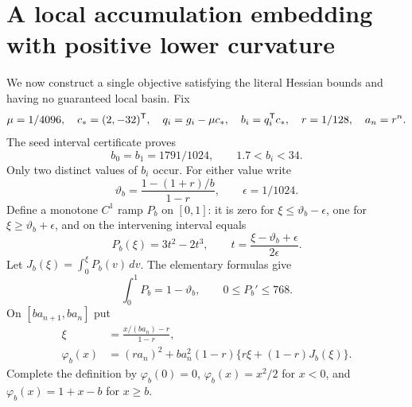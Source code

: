 \documentclass[10pt,oneside,openany]{book}
\theoremstyle{remark}\newtheorem{remark}{Remark}[chapter]
\begin{document}
\section{A local accumulation embedding with positive lower curvature}
We now construct a single objective satisfying the literal Hessian bounds and having no guaranteed local basin. Fix
\[
 \mu=1/4096,\quad c_*=(2,-32)^{\mathsf T},\quad
 q_i=g_i-\mu c_*,\quad b_i=q_i^{\mathsf T} c_*,\quad r=1/128,\quad a_n=r^n.
\]
The seed interval certificate proves
\[
 b_0=b_1=1791/1024,\qquad 1.7<b_i<34.
\]
Only two distinct values of $b_i$ occur. For either value write
\[
 \vartheta_b=\frac{1-(1+r)/b}{1-r},\qquad \epsilon=1/1024.
\]
Define a monotone $C^1$ ramp $P_b$ on $[0,1]$: it is zero for $\xi\le\vartheta_b-\epsilon$, one for $\xi\ge\vartheta_b+\epsilon$, and on the intervening interval equals
\[
 P_b(\xi)=3t^2-2t^3,\qquad t=\frac{\xi-\vartheta_b+\epsilon}{2\epsilon}.
\]
Let $J_b(\xi)=\int_0^\xi P_b(v)\,dv$. The elementary formulas give
\[
 \int_0^1P_b=1-\vartheta_b,\qquad 0\le P_b'\le768.
\]
On $[ba_{n+1},ba_n]$ put
\begin{align}
 \xi&=\frac{x/(ba_n)-r}{1-r},\\
 \varphi_b(x)&=(ra_n)^2+ba_n^2(1-r)
 \{r\xi+(1-r)J_b(\xi)\}.\label{L:eq:scalar}
\end{align}
Complete the definition by $\varphi_b(0)=0$, $\varphi_b(x)=x^2/2$ for $x<0$, and $\varphi_b(x)=1+x-b$ for $x\ge b$.
\end{document}
